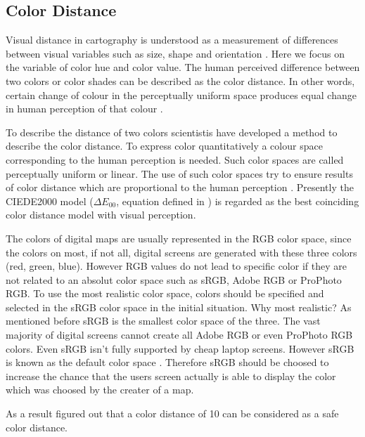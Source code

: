 \subsection{Color Distance}\label{subsection:distance}
Visual distance in cartography is understood as a measurement of differences between visual variables such as size, shape and orientation \parencite{brychtova2015}. Here we focus on the variable of color hue and color value. The human perceived difference between two colors or color shades can be described as the color distance. In other words, certain change of colour in the perceptually uniform space produces equal change in human perception of that colour \parencite{brychtovaC2017}.

To describe the distance of two colors scientistis have developed a method to describe the color distance. To express color quantitatively a colour space corresponding to the human perception is needed. Such color spaces are called perceptually uniform or linear. The use of such color spaces try to ensure results of color distance which are proportional to the human perception \parencite{brychtova2015}. Presently the CIEDE2000 model ($\Delta E_{00}$, equation defined in \textcite{brychtova2015}) is regarded as the best coinciding color distance model with visual perception. 
 
The colors of digital maps are usually represented in the RGB color space, since the colors on most, if not all, digital screens are generated with these three colors (red, green, blue). However RGB values do not lead to specific color if they are not related to an absolut color space such as sRGB, Adobe RGB or ProPhoto RGB. To use the most realistic color space, colors should be specified and selected in the sRGB color space in the initial situation. Why most realistic? As mentioned before sRGB is the smallest color space of the three. The vast majority of digital screens cannot create all Adobe RGB or even ProPhoto RGB colors. Even sRGB isn't fully supported by cheap laptop screens. However sRGB is known as the default color space \parencite{kenrockwell2006}. Therefore sRGB should be choosed to increase the chance that the users screen actually is able to display the color which was choosed by the creater of a map. 

As a result \textcite{brychtovaC2015, brychtovaC2016} figured out that a color distance of 10 can be considered as a safe color distance.

